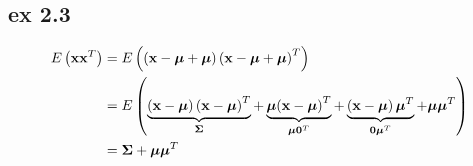 \documentclass[10pt]{article}
\begin{document}
\subsection{ex 2.3}
\begin{equation}
\begin{split}
E\left( {\mathbf{x}{\mathbf{x}^T}} \right) &= E\left( {\left( {\mathbf{x} - \boldsymbol{\mu}  + \boldsymbol{\mu} } \right){{\left( {\mathbf{x} - \boldsymbol{\mu}  + \boldsymbol{\mu} } \right)}^T}} \right) \hfill \\
&= E\left( {\underbrace {\left( {\mathbf{x} - \boldsymbol{\mu} } \right){{\left( {\mathbf{x} - \boldsymbol{\mu} } \right)}^T}}_{\boldsymbol{\Sigma}}  + \underbrace {\boldsymbol{\mu} {{\left( {\mathbf{x} - \boldsymbol{\mu} } \right)}^T}}_{\boldsymbol{\mu} {\mathbf{0}^T}} + \underbrace {\left( {\mathbf{x} - \boldsymbol{\mu} } \right){\boldsymbol{\mu} ^T}}_{\mathbf{0}{\boldsymbol{\mu} ^T}} + \boldsymbol{\mu} {\boldsymbol{\mu} ^T}} \right) \hfill \\
&= \boldsymbol{\Sigma}  + \boldsymbol{\mu} {\boldsymbol{\mu} ^T} \hfill \\ 
\end{split}
\end{equation}
\end{document}
